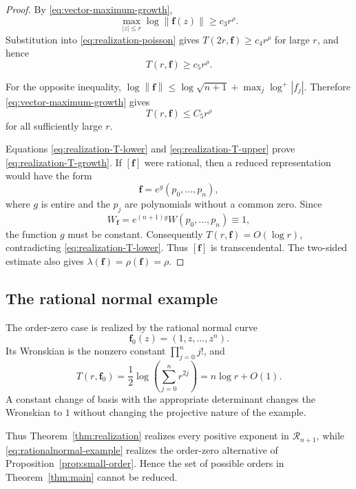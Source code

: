 \documentclass[12pt,letterpaper,reqno]{amsart}
\theoremstyle{definition}
\numberwithin{equation}{section}
\newcommand{\norm}[1]{\left\lVert#1\right\rVert}
\newcommand{\Gn}{\mathcal R_{n+1}}
\newcommand{\fv}{\bm f}
\begin{document}
\begin{proof}
By \eqref{eq:vector-maximum-growth},
\[
\max_{|z|\leq r}\log\norm{\fv(z)}
\geq
c_3r^\rho.
\]
Substitution into \eqref{eq:realization-poisson} gives
\(T(2r,\fv)\geq c_4r^\rho\) for large \(r\), and hence
\begin{equation}\label{eq:realization-T-lower}
 T(r,\fv)\geq c_5r^\rho.
\end{equation}

For the opposite inequality,
\(\log\norm{\fv}\leq
\log\sqrt {n+1}+\max_j\log^+|f_j|\).
Therefore \eqref{eq:vector-maximum-growth} gives
\begin{equation}\label{eq:realization-T-upper}
 T(r,\fv)\leq C_5r^\rho
\end{equation}
for all sufficiently large \(r\).

Equations \eqref{eq:realization-T-lower} and
\eqref{eq:realization-T-upper} prove
\eqref{eq:realization-T-growth}. If \([\fv]\) were rational, then a
reduced representation would have the form
\[
 \fv=e^g(p_0,\ldots,p_n),
\]
where \(g\) is entire and the \(p_j\) are polynomials without a common
zero. Since
\[
 W_{\fv}=e^{(n+1)g}W(p_0,\ldots,p_n)\equiv1,
\]
the function \(g\) must be constant. Consequently
\(T(r,\fv)=O(\log r)\), contradicting
\eqref{eq:realization-T-lower}. Thus \([\fv]\) is transcendental.
The two-sided
estimate also gives
\(\lambda(\fv)=\rho(\fv)=\rho\).
\end{proof}


\subsection{The rational normal example}

The order-zero case is realized by the rational normal curve
\begin{equation}\label{eq:rationalnormal-example}
 \fv_0(z)
 =
 (1,z,\ldots,z^{n}).
\end{equation}
Its Wronskian is the nonzero constant
\(\prod_{j=0}^{n}j!\), and
\begin{equation}\label{eq:rationalnormal-growth}
 T(r,\fv_0)
 =
 \frac12
 \log\left(
 \sum_{j=0}^{n}r^{2j}
 \right)
 =
 n\log r+O(1).
\end{equation}
A constant change of basis with the appropriate determinant changes
the Wronskian to \(1\) without changing the projective nature of the
example.

Thus Theorem~\ref{thm:realization} realizes every positive exponent in
\(\Gn\), while \eqref{eq:rationalnormal-example} realizes the
order-zero alternative of Proposition~\ref{prop:small-order}. Hence
the set of possible orders in Theorem~\ref{thm:main} cannot be
reduced.
\end{document}
